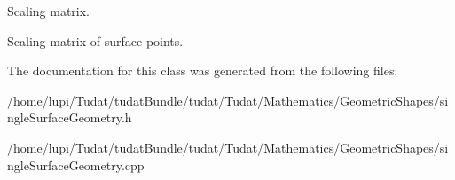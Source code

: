Scaling matrix. 

Scaling matrix of surface points. 

The documentation for this class was generated from the following files\+:\begin{DoxyCompactItemize}
\item 
/home/lupi/\+Tudat/tudat\+Bundle/tudat/\+Tudat/\+Mathematics/\+Geometric\+Shapes/single\+Surface\+Geometry.\+h\item 
/home/lupi/\+Tudat/tudat\+Bundle/tudat/\+Tudat/\+Mathematics/\+Geometric\+Shapes/single\+Surface\+Geometry.\+cpp\end{DoxyCompactItemize}
